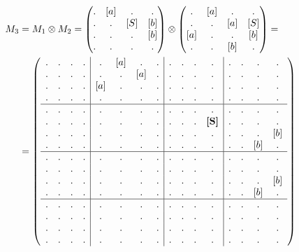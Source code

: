 \begin{example}
\begin{align}
M_3 &= M_1 \otimes M_2 = 
\begin{pmatrix} 
. & [a] & . & . \\
. & . & [S] & [b] \\
. & . & . & [b] \\
. & . & . & . 
\end{pmatrix}
\otimes 
\begin{pmatrix} 
. & [a] & . & . \\
. & . & [a] & [S] \\
[a] & . & . & [b] \\
. & . & [b] & . 
\end{pmatrix}
=\notag\\
&=
\left(\begin{array}{c c c c | c c c c | c c c c | c c c c } 
. & . & . & .  &  . & [a] & . & .  &  . & . & . & .    &  . & . & . & .   \\
. & . & . & .  &  . & . & [a] & .  &  . & . & . & .    &  . & . & . & .   \\
. & . & . & .  &  [a] & . & . & .  &  . & . & . & .    &  . & . & . & .   \\
. & . & . & .  &  . & . & . & .    &  . & . & . & .    &  . & . & . & .   \\
\hline
. & . & . & .  &  . & . & . & .    &  . & . & . & .    &  . & . & . & .   \\
. & . & . & .  &  . & . & . & .    &  . & . & . & \textbf{[S]}  &  . & . & . & .   \\
. & . & . & .  &  . & . & . & .    &  . & . & . & .    &  . & . & . & [b] \\
. & . & . & .  &  . & . & . & .    &  . & . & . & .    &  . & . & [b] & . \\
\hline
. & . & . & .  &  . & . & . & .    &  . & . & . & .    &  . & . & . & .   \\
. & . & . & .  &  . & . & . & .    &  . & . & . & .    &  . & . & . & .   \\
. & . & . & .  &  . & . & . & .    &  . & . & . & .    &  . & . & . & [b] \\
. & . & . & .  &  . & . & . & .    &  . & . & . & .    &  . & . & [b] & . \\
\hline
. & . & . & .  &  . & . & . & .    &  . & . & . & .    &  . & . & . & .   \\
. & . & . & .  &  . & . & . & .    &  . & . & . & .    &  . & . & . & .   \\
. & . & . & .  &  . & . & . & .    &  . & . & . & .    &  . & . & . & .   \\
. & . & . & .  &  . & . & . & .    &  . & . & . & .    &  . & . & . & . 
\end{array}\right)
\end{align}


\end{example}
